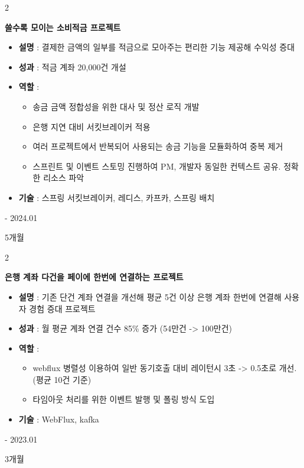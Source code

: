 \documentclass[10pt, letterpaper]{article}
\newenvironment{highlights}{
    \begin{itemize}[
        topsep=0.10 cm,
        parsep=0.10 cm,
        partopsep=0pt,
        itemsep=0pt,
        leftmargin=0.4 cm + 10pt
    ]
    }{
    \end{itemize}
} %
\newenvironment{twocolentry}[2][]{
    \onecolentry
    \def\secondColumn{#2}
    \setcolumnwidth{\fill, 4.5 cm}
    \begin{paracol}{2}
    }{
        \switchcolumn \raggedleft \secondColumn
    \end{paracol}
    \endonecolentry
} %
\begin{document}
    \vspace{0.2 cm}

    \begin{twocolentry}{
        2023.07 - 2024.01

        5개월
    }
        \textbf{쓸수록 모이는 소비적금 프로젝트}
        \begin{highlights}

            \item \textbf{설명} : 결제한 금액의 일부를 적금으로 모아주는 편리한 기능 제공해 수익성 증대
            \item \textbf{성과} : 적금 계좌 20,000건 개설
            \item \textbf{역할} :
            \begin{highlights}
                \item 송금 금액 정합성을 위한 대사 및 정산 로직 개발
                \item 은행 지연 대비 서킷브레이커 적용
                \item 여러 프로젝트에서 반복되어 사용되는 송금 기능을 모듈화하여 중복 제거
                \item 스프린트 및 이벤트 스토밍 진행하여 PM, 개발자 동일한 컨텍스트 공유. 정확한 리소스 파악
            \end{highlights}
            \item \textbf{기술} : 스프링 서킷브레이커, 레디스, 카프카, 스프링 배치
        \end{highlights}
    \end{twocolentry}

    \vspace{0.2 cm}

    \begin{twocolentry}{
        2022.10 - 2023.01

        3개월
    }
        \textbf{은행 계좌 다건을 페이에 한번에 연결하는 프로젝트}
        \begin{highlights}

            \item \textbf{설명} : 기존 단건 계좌 연결을 개선해 평균 5건 이상 은행 계좌 한번에 연결해 사용자 경험 증대 프로젝트
            \item \textbf{성과} : 월 평균 계좌 연결 건수 85\% 증가 (54만건 -> 100만건)
            \item \textbf{역할} :
            \begin{highlights}
                \item webflux 병렬성 이용하여 일반 동기호출 대비 레이턴시 3초 -> 0.5초로 개선. (평균 10건 기준)
                \item 타임아웃 처리를 위한 이벤트 발행 및 폴링 방식 도입
            \end{highlights}
            \item \textbf{기술} : WebFlux, kafka
        \end{highlights}
    \end{twocolentry}
\end{document}
